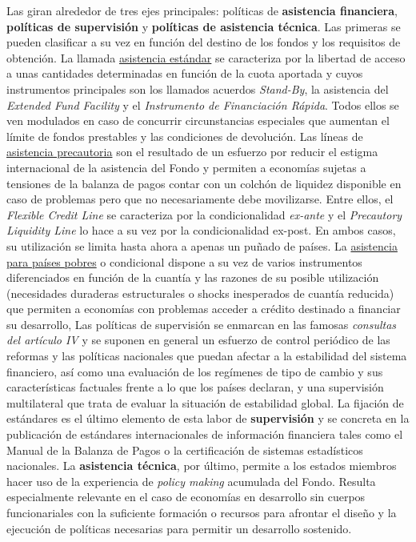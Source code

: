 \documentclass{nuevotema}
\begin{document}
Las  giran alrededor de tres ejes principales: políticas de \textbf{asistencia financiera}, \textbf{políticas de supervisión} y \textbf{políticas de asistencia técnica}. Las primeras se pueden clasificar a su vez en función del destino de los fondos y los requisitos de obtención. La llamada \underline{asistencia estándar} se caracteriza por la libertad de acceso a unas cantidades determinadas en función de la cuota aportada y cuyos instrumentos principales son los llamados acuerdos \textit{Stand-By}, la asistencia del \textit{Extended Fund Facility} y el \textit{Instrumento de Financiación Rápida}. Todos ellos se ven modulados en caso de concurrir circunstancias especiales que aumentan el límite de fondos prestables y las condiciones de devolución. Las líneas de \underline{asistencia precautoria} son el resultado de un esfuerzo por reducir el estigma internacional de la asistencia del Fondo y permiten a economías sujetas a tensiones de la balanza de pagos contar con un colchón de liquidez disponible en caso de problemas pero que no necesariamente debe movilizarse. Entre ellos, el \textit{Flexible Credit Line} se caracteriza por la condicionalidad \textit{ex-ante} y el \textit{Precautory Liquidity Line} lo hace a su vez por la condicionalidad ex-post. En ambos casos, su utilización se limita hasta ahora a apenas un puñado de países. La \underline{asistencia para países pobres} o condicional dispone a su vez de varios instrumentos diferenciados en función de la cuantía y las razones de su posible utilización (necesidades duraderas estructurales o shocks inesperados de cuantía reducida) que permiten a economías con problemas acceder a crédito destinado a financiar su desarrollo, Las políticas de supervisión se enmarcan en las famosas \textit{consultas del artículo IV} y se suponen en general un esfuerzo de control periódico de las reformas y las políticas nacionales que puedan afectar a la estabilidad del sistema financiero, así como una evaluación de los regímenes de tipo de cambio y sus características factuales frente a lo que los países declaran, y una supervisión multilateral que trata de evaluar la situación de estabilidad global. La fijación de estándares es el último elemento de esta labor de \textbf{supervisión} y se concreta en la publicación de estándares internacionales de información financiera tales como el Manual de la Balanza de Pagos o la certificación de sistemas estadísticos nacionales. La \textbf{asistencia técnica}, por último, permite a los estados miembros hacer uso de la experiencia de \textit{policy making} acumulada del Fondo. Resulta especialmente relevante en el caso de economías en desarrollo sin cuerpos funcionariales con la suficiente formación o recursos para afrontar el diseño y la ejecución de políticas necesarias para permitir un desarrollo sostenido.
\end{document}
